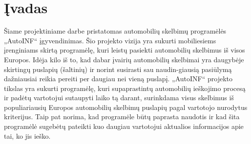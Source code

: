 \documentclass[12pt]{article}
\begin{document}
	{\tableofcontents}
	\pagebreak

	\section*{Įvadas}
	
	\begin{indent}
	Šiame projektiniame darbe pristatomas automobilių skelbimų programėlės „AutoINF“ įgyvendinimas. Šio projekto vizija yra sukurti mobiliesiems įrenginiams skirtą programėlę, kuri leistų pasiekti automobilių skelbimus iš visos Europos. Idėja kilo iš to, kad dabar įvairių automobilių skelbimai yra daugybėje skirtingų puslapių (šaltinių) ir norint susirasti sau naudin-giausią pasiūlymą dažniausiai reikia pereiti per daugiau nei vieną puslapį. „AutoINF“ projekto tikslas yra sukurti programėlę, kuri supaprastintų automobilių ieškojimo procesą ir padėtų vartotojui sutaupyti laiko tą darant, surinkdama visus skelbimus iš populiariausių Europos automobilių skelbimų puslapių pagal vartotojo nurodytus kriterijus. Taip pat norima, kad programėle būtų paprasta naudotis ir kad šita programėlė sugebėtų pateikti kuo daugiau vartotojui aktualios informacijos apie tai, ko jis ieško.
	\end{indent}
	
	
	
	
	
	
	
	
\end{document}
